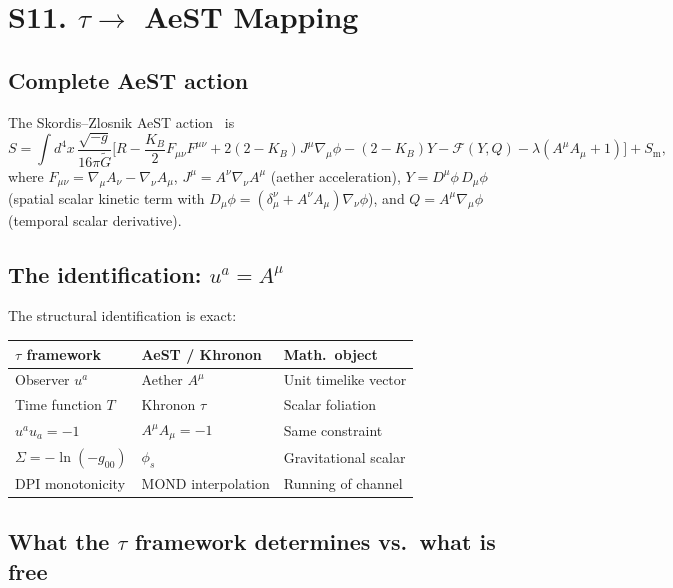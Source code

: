 \documentclass[aps,prd,preprint,superscriptaddress,longbibliography]{revtex4-2}
\newcommand{\tauasym}{\tau}
\begin{document}
\section{S11. $\tauasym\to$ AeST Mapping}
\label{sec:AeST}

\subsection{Complete AeST action}

The Skordis--Zlosnik AeST action~\cite{SkordisZlosnik2021} is
\begin{equation}
S = \int d^4x\,\frac{\sqrt{-g}}{16\pi\tilde{G}}
\Big[R - \frac{K_B}{2}F_{\mu\nu}F^{\mu\nu}
+ 2(2-K_B)J^\mu\nabla_\mu\phi
- (2-K_B)Y - \mathcal{F}(Y,Q)
- \lambda(A^\mu A_\mu + 1)\Big]
+ S_{\mathrm{m}},
\label{eq:AeST}
\end{equation}
where $F_{\mu\nu} = \nabla_\mu A_\nu - \nabla_\nu A_\mu$,
$J^\mu = A^\nu\nabla_\nu A^\mu$ (aether acceleration),
$Y = D^\mu\phi\,D_\mu\phi$ (spatial scalar kinetic term with
$D_\mu\phi = (\delta^\nu_\mu + A^\nu A_\mu)\nabla_\nu\phi$),
and $Q = A^\mu\nabla_\mu\phi$ (temporal scalar derivative).

\subsection{The identification: $u^a = A^\mu$}

The structural identification is exact:

\begin{center}
\begin{tabular}{lll}
\toprule
$\tauasym$ framework & AeST / Khronon & Math.\ object \\
\midrule
Observer $u^a$ & Aether $A^\mu$ & Unit timelike vector \\
Time function $T$ & Khronon $\tau$ & Scalar foliation \\
$u^a u_a = -1$ & $A^\mu A_\mu = -1$ & Same constraint \\
$\Sigma = -\ln(-g_{00})$ & $\phi_s$ & Gravitational scalar \\
DPI monotonicity & MOND interpolation & Running of channel \\
\bottomrule
\end{tabular}
\end{center}

\subsection{What the $\tauasym$ framework determines vs.\ what is free}
\end{document}
